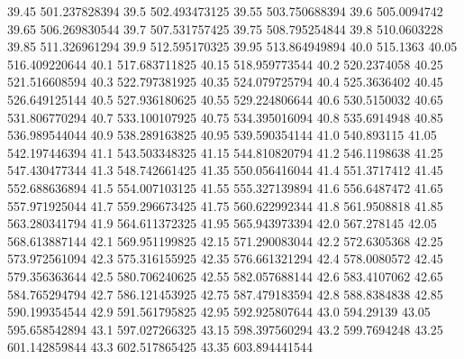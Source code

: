           39.45    501.237828394
           39.5    502.493473125
          39.55    503.750688394
           39.6      505.0094742
          39.65    506.269830544
           39.7    507.531757425
          39.75    508.795254844
           39.8      510.0603228
          39.85    511.326961294
           39.9    512.595170325
          39.95    513.864949894
           40.0         515.1363
          40.05    516.409220644
           40.1    517.683711825
          40.15    518.959773544
           40.2      520.2374058
          40.25    521.516608594
           40.3    522.797381925
          40.35    524.079725794
           40.4      525.3636402
          40.45    526.649125144
           40.5    527.936180625
          40.55    529.224806644
           40.6      530.5150032
          40.65    531.806770294
           40.7    533.100107925
          40.75    534.395016094
           40.8      535.6914948
          40.85    536.989544044
           40.9    538.289163825
          40.95    539.590354144
           41.0       540.893115
          41.05    542.197446394
           41.1    543.503348325
          41.15    544.810820794
           41.2      546.1198638
          41.25    547.430477344
           41.3    548.742661425
          41.35    550.056416044
           41.4      551.3717412
          41.45    552.688636894
           41.5    554.007103125
          41.55    555.327139894
           41.6      556.6487472
          41.65    557.971925044
           41.7    559.296673425
          41.75    560.622992344
           41.8      561.9508818
          41.85    563.280341794
           41.9    564.611372325
          41.95    565.943973394
           42.0       567.278145
          42.05    568.613887144
           42.1    569.951199825
          42.15    571.290083044
           42.2      572.6305368
          42.25    573.972561094
           42.3    575.316155925
          42.35    576.661321294
           42.4      578.0080572
          42.45    579.356363644
           42.5    580.706240625
          42.55    582.057688144
           42.6      583.4107062
          42.65    584.765294794
           42.7    586.121453925
          42.75    587.479183594
           42.8      588.8384838
          42.85    590.199354544
           42.9    591.561795825
          42.95    592.925807644
           43.0        594.29139
          43.05    595.658542894
           43.1    597.027266325
          43.15    598.397560294
           43.2      599.7694248
          43.25    601.142859844
           43.3    602.517865425
          43.35    603.894441544

